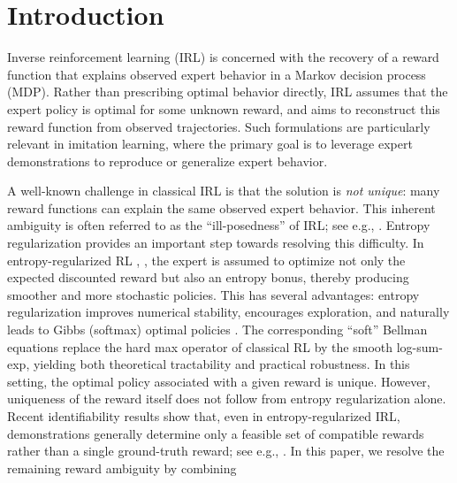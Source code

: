 \documentclass{article}
\theoremstyle{definition}
\theoremstyle{remark}
\theoremstyle{plain}
\numberwithin{equation}{section}
\begin{document}
\maketitle


\tableofcontents

\section{Introduction}
\label{sec:introduction}

Inverse reinforcement learning (IRL) is concerned with the recovery of a reward 
function that explains observed expert behavior in a Markov decision process (MDP). 
Rather than prescribing optimal behavior directly, IRL assumes that the expert policy 
is optimal for some unknown reward, and aims to reconstruct this reward 
function from observed trajectories. Such formulations are particularly relevant 
in imitation learning, where the primary goal is to leverage expert demonstrations 
to reproduce or generalize expert behavior.
\par
A well-known challenge in classical IRL is that the solution is \emph{not unique}: 
many reward functions can explain the same observed expert behavior. This inherent 
ambiguity is often referred to as the ``ill-posedness'' of IRL; see e.g.,  \cite{ng2000algorithms}. Entropy regularization provides an important step towards resolving this difficulty. 
In entropy-regularized RL \cite{neu2017unifiedviewentropyregularizedmarkov}, \cite{pmlr-v97-geist19a}, the expert is assumed to optimize 
not only the expected discounted reward but also an entropy bonus, thereby producing 
smoother and more stochastic policies. This has several advantages: entropy 
regularization improves numerical stability, encourages exploration, and naturally 
leads to Gibbs (softmax) optimal policies  \cite{pmlr-v97-ahmed19a}. The corresponding ``soft'' Bellman 
equations replace the hard max operator of classical RL by the smooth log-sum-exp, 
yielding both theoretical tractability and practical robustness. In this setting, 
the optimal policy associated with a given reward is unique. However, uniqueness of the reward itself does not follow from entropy regularization 
alone. Recent identifiability results show that, even in entropy-regularized IRL, demonstrations generally determine only a feasible set of compatible rewards rather than a single ground-truth reward; see e.g., \cite{cao2021identifiability,skalse2023invariance,schlaginhaufen2024transferability,schlaginhaufen2023identifiability}. In this paper, we resolve the remaining reward ambiguity by combining
\end{document}
